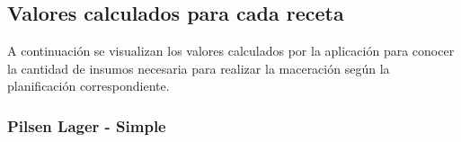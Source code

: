\begin{minipage}{0.95\textwidth}
    \subsection{Valores calculados para cada receta}
    \hfill \break
    \par A continuación se visualizan los valores calculados por la aplicación para conocer la cantidad de insumos necesaria para realizar la maceración según la planificación correspondiente. 
    \end{minipage}
        \subsubsection{Pilsen Lager - Simple}
    
